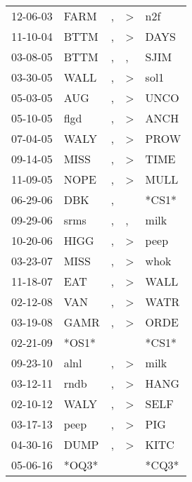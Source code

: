 \begin{supertabular}{lllll}
 12-06-03 &   FARM &             , &     \textgreater &    n2f \\
 11-10-04 &   BTTM &             , &     \textgreater &   DAYS \\
 03-08-05 &   BTTM &             , &                , &   SJIM \\
 03-30-05 &   WALL &             , &     \textgreater &   sol1 \\
 05-03-05 &    AUG &             , &     \textgreater &   UNCO \\
 05-10-05 &   flgd &             , &     \textgreater &   ANCH \\
 07-04-05 &   WALY &             , &     \textgreater &   PROW \\
 09-14-05 &   MISS &             , &     \textgreater &   TIME \\
 11-09-05 &   NOPE &             , &     \textgreater &   MULL \\
 06-29-06 &    DBK &             , &                  &  *CS1* \\
 09-29-06 &   srms &             , &                , &   milk \\
 10-20-06 &   HIGG &             , &     \textgreater &   peep \\
 03-23-07 &   MISS &             , &     \textgreater &   whok \\
 11-18-07 &    EAT &             , &     \textgreater &   WALL \\
 02-12-08 &    VAN &             , &     \textgreater &   WATR \\
 03-19-08 &   GAMR &             , &     \textgreater &   ORDE \\
 02-21-09 &  *OS1* &               &                  &  *CS1* \\
 09-23-10 &   alnl &             , &     \textgreater &   milk \\
 03-12-11 &   rndb &             , &     \textgreater &   HANG \\
 02-10-12 &   WALY &             , &     \textgreater &   SELF \\
 03-17-13 &   peep &             , &     \textgreater &    PIG \\
 04-30-16 &   DUMP &             , &     \textgreater &   KITC \\
 05-06-16 &  *OQ3* &               &                  &  *CQ3* \\
\end{supertabular}
